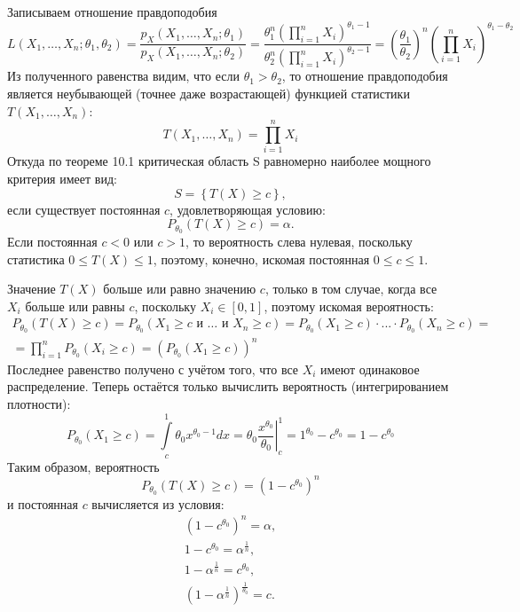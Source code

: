 Записываем отношение правдоподобия
\begin{equation}
    L(X_1, \dots, X_n; \theta_1, \theta_2)
    = \frac{p_X(X_1, \dots, X_n; \theta_1)}{p_X(X_1, \dots, X_n; \theta_2)}
    = \frac{\theta_1^n \left ( \prod_{i=1}^n X_i \right )^{\theta_1 - 1}}{\theta_2^n \left ( \prod_{i=1}^n X_i \right )^{\theta_2 - 1}}
    = \left ( \frac{\theta_1}{\theta_2} \right )^n \left ( \prod_{i=1}^n X_i \right )^{\theta_1 - \theta_2}
\end{equation}
Из полученного равенства видим, что если $\theta_1 > \theta_2$, то отношение правдоподобия является неубывающей (точнее даже возрастающей)
функцией статистики $T(X_1, \dots, X_n)$:
\begin{equation}
    T(X_1, \dots, X_n) = \prod_{i=1}^n X_i
\end{equation}
Откуда по теореме 10.1 критическая область S равномерно наиболее мощного критерия имеет вид:
\begin{equation}
    S = \left \{ T(X) \ge c \right \} ,
\end{equation}
если существует постоянная $c$, удовлетворяющая условию:
\begin{equation}
    P_{\theta_0} ( T(X) \ge c ) = \alpha .
\end{equation}
Если постоянная $c < 0$ или $c > 1$, то вероятность слева нулевая, поскольку статистика $0 \le T(X) \le 1$, поэтому, конечно,
искомая постоянная $0 \le c \le 1$.

Значение $T(X)$ больше или равно значению $c$, только в том случае, когда все $X_i$ больше или равны $c$, поскольку $X_i \in [0, 1]$,
поэтому искомая вероятность:
\begin{multline}
    P_{\theta_0} ( T(X) \ge c )
    = P_{\theta_0} ( X_1 \ge c \text{ и } \dots \text{ и } X_n \ge c )
    = P_{\theta_0} ( X_1 \ge c ) \cdot ... \cdot P_{\theta_0} ( X_n \ge c ) = \\
    = \prod_{i=1}^n P_{\theta_0} ( X_i \ge c )
    = \left ( P_{\theta_0} ( X_1 \ge c ) \right )^n
\end{multline}
Последнее равенство получено с учётом того, что все $X_i$ имеют одинаковое распределение. Теперь остаётся только вычислить вероятность
(интегрированием плотности):
\begin{equation}
    P_{\theta_0} ( X_1 \ge c )
    = \int \limits_c^1 \theta_0 x^{\theta_0 - 1} dx
    = \theta_0 \left . \frac{x^{\theta_0}}{\theta_0} \right |_c^1
    = 1^{\theta_0} - c^{\theta_0}
    = 1 - c^{\theta_0}
\end{equation}
Таким образом, вероятность
\begin{equation}
    P_{\theta_0} ( T(X) \ge c ) = \left ( 1 - c^{\theta_0} \right )^n
\end{equation}
и постоянная $c$ вычисляется из условия:
\begin{gather}
    \left ( 1 - c^{\theta_0} \right )^n = \alpha , \\
    1 - c^{\theta_0} = \alpha^{\frac{1}{n}} , \\
    1 - \alpha^{\frac{1}{n}} = c^{\theta_0} , \\
    \left ( 1 - \alpha^{\frac{1}{n}} \right )^\frac{1}{\theta_0} = c .
\end{gather}

